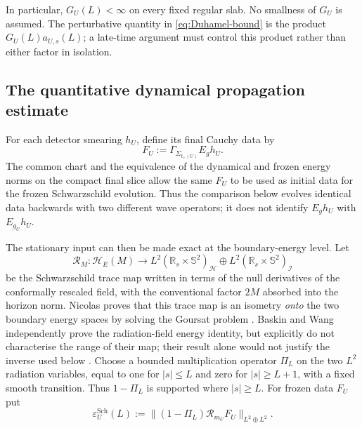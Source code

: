 \documentclass[11pt,a4paper]{article}
\theoremstyle{definition}
\theoremstyle{remark}
\newcommand{\scrI}{\mathscr I}
\newcommand{\HH}{\mathcal H}
\begin{document}
	In particular, $G_U(L)<\infty$ on every fixed regular slab.  No smallness of
	$G_U$ is assumed.  The perturbative quantity in
	\eqref{eq:Duhamel-bound} is the product $G_U(L)a_{U,s}(L)$; a late-time
	argument must control this product rather than either factor in isolation.
	
	\subsection{The quantitative dynamical propagation estimate}
	
	For each detector smearing $h_U$, define its final Cauchy data by
	\begin{equation}
		F_U:=\Gamma_{\Sigma_{t_+(U)}}E_gh_U.
		\label{eq:detector-final-data}
	\end{equation}
	The common chart and the equivalence of the dynamical and frozen energy norms
	on the compact final slice allow the same $F_U$ to be used as initial data for
	the frozen Schwarzschild evolution.  Thus the comparison below evolves
	identical data backwards with two different wave operators; it does not
	identify $E_gh_U$ with $E_{g_U}h_U$.
	
	The stationary input can then be made exact at the boundary-energy level.  Let
	\begin{equation}
		\mathcal R_M:\mathcal H_E(M)\longrightarrow
		L^2(\mathbb R_s\!\times\mathbb S^2)_{\HH}
		\oplus L^2(\mathbb R_s\!\times\mathbb S^2)_{\scrI}
		\label{eq:Sch-radiation-map}
	\end{equation}
	be the Schwarzschild trace map written in terms of the null derivatives of
	the conformally rescaled field, with the conventional factor $2M$ absorbed
	into the horizon norm.  Nicolas proves that this trace map is an isometry
	\emph{onto} the two boundary energy spaces by solving the Goursat problem
	\cite{Nicolas2016}.  Baskin and Wang independently prove the radiation-field
	energy identity, but explicitly do not characterise the range of their map;
	their result alone would not justify the inverse used below
	\cite{BaskinWang2014}.  Choose a bounded multiplication operator $\Pi_L$ on
	the two $L^2$ radiation variables, equal to one for $|s|\leq L$ and zero for
	$|s|\geq L+1$, with a fixed smooth transition.  Thus
	$1-\Pi_L$ is supported where $|s|\geq L$.  For
	frozen data $F_U$ put
	\begin{equation}
		\varepsilon^{\mathrm{Sch}}_{U}(L)
		:=\|(1-\Pi_L)\mathcal R_{m_U}F_U\|_{L^2\oplus L^2}.
		\label{eq:exact-Sch-tail}
	\end{equation}
	
\end{document}
